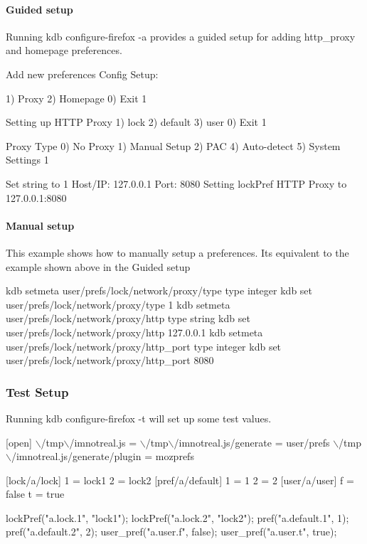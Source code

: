 \paragraph*{Guided setup}

Running {\ttfamily kdb configure-\/firefox -\/a} provides a guided setup for adding http\+\_\+proxy and homepage preferences.


\begin{DoxyCode}
Add new preferences
Config Setup:

1) Proxy
2) Homepage
0) Exit
1

Setting up HTTP Proxy
1) lock
2) default
3) user
0) Exit
1

Proxy Type
0) No Proxy
1) Manual Setup
2) PAC
4) Auto-detect
5) System Settings
1

Set string to 1
Host/IP: 127.0.0.1
Port: 8080
Setting lockPref HTTP Proxy to 127.0.0.1:8080
\end{DoxyCode}


\paragraph*{Manual setup}

This example shows how to manually setup a preferences. It\textquotesingle{}s equivalent to the example shown above in the {\ttfamily Guided setup}


\begin{DoxyCode}
kdb setmeta user/prefs/lock/network/proxy/type type integer
kdb set user/prefs/lock/network/proxy/type 1
kdb setmeta user/prefs/lock/network/proxy/http type string
kdb set user/prefs/lock/network/proxy/http 127.0.0.1
kdb setmeta user/prefs/lock/network/proxy/http\_port type integer
kdb set user/prefs/lock/network/proxy/http\_port 8080
\end{DoxyCode}


\subsubsection*{Test Setup}

Running {\ttfamily kdb configure-\/firefox -\/t} will set up some test values.


\begin{DoxyCode}

[open]
\(\backslash\)/tmp\(\backslash\)/imnotreal.js =
\(\backslash\)/tmp\(\backslash\)/imnotreal.js/generate = user/prefs
\(\backslash\)/tmp\(\backslash\)/imnotreal.js/generate/plugin = mozprefs



[lock/a/lock]
1 = lock1
2 = lock2
[pref/a/default]
1 = 1
2 = 2
[user/a/user]
f = false
t = true


lockPref("a.lock.1", "lock1");
lockPref("a.lock.2", "lock2");
pref("a.default.1", 1);
pref("a.default.2", 2);
user\_pref("a.user.f", false);
user\_pref("a.user.t", true);
\end{DoxyCode}




